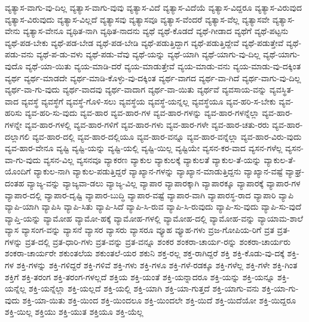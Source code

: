 {ವ್ಯತ್ಯಾಸ-ವಾಗು-ವು-ದಿಲ್ಲ
ವ್ಯತ್ಯಾಸ-ವಾಗು-ವುವು
ವ್ಯತ್ಯಾಸ-ವಿದೆ
ವ್ಯತ್ಯಾಸ-ವಿದೆಯೆ
ವ್ಯತ್ಯಾಸ-ವಿದ್ದರೂ
ವ್ಯತ್ಯಾಸ-ವಿರುವುದ
ವ್ಯತ್ಯಾಸ-ವಿರುವುದು
ವ್ಯತ್ಯಾಸ-ವಿಲ್ಲದೆ
ವ್ಯತ್ಯಾಸವು
ವ್ಯತ್ಯಾಸವೂ
ವ್ಯತ್ಯಾಸ-ವೆಂದರೆ
ವ್ಯತ್ಯಾಸ-ವೆಲ್ಲ
ವ್ಯತ್ಯಾಸವೇ
ವ್ಯತ್ಯಾಸ-ವೇನು
ವ್ಯತ್ಯಾಸ-ವೇನೂ
ವ್ಯಥಿತ-ನಾಗಿ
ವ್ಯಥಿತ-ನಾದನು
ವ್ಯಥೆ
ವ್ಯಥೆ-ಕೊಡದೆ
ವ್ಯಥೆ-ಗೀಡಾದ
ವ್ಯಥೆಗೆ
ವ್ಯಥೆ-ಪಟ್ಟನು
ವ್ಯಥೆ-ಪಡ-ಬೇಕು
ವ್ಯಥೆ-ಪಡ-ಬೇಡ
ವ್ಯಥೆ-ಪಡ-ಬೇಡಿ
ವ್ಯಥೆ-ಪಡುತ್ತಿದ್ದಾಗ
ವ್ಯಥೆ-ಪಡುತ್ತಿದ್ದೇವೆ
ವ್ಯಥೆ-ಪಡುತ್ತೇವೆ
ವ್ಯಥೆ-ಪಡು-ವನು
ವ್ಯಥೆ-ಪ-ಡು-ವಳು
ವ್ಯಥೆ-ಪಡು-ವೆವು
ವ್ಯಥೆ-ಯನ್ನು
ವ್ಯಥೆ-ಯಾಗಿ
ವ್ಯಥೆ-ಯಾಗು-ವು-ದಿಲ್ಲ
ವ್ಯಥೆ-ಯಾಗು-ವುದೊ
ವ್ಯಥೆ-ಯಾ-ಯಿತು
ವ್ಯಯ-ಮಾಡಿ-ದರೆ
ವ್ಯಯ-ಮಾಡುತ್ತೇವೆ
ವ್ಯಯ-ಮಾಡು-ವನು
ವ್ಯಯ-ಮಾಡು-ವು-ದಕ್ಕಿಂತ
ವ್ಯರ್ಥ
ವ್ಯರ್ಥ-ಮಾಡದೇ
ವ್ಯರ್ಥ-ಮಾಡಿ-ಕೊಳ್ಳು-ವು-ದಕ್ಕಿಂತ
ವ್ಯರ್ಥ-ವಾಗದ
ವ್ಯರ್ಥ-ವಾ-ಗಿದೆ
ವ್ಯರ್ಥ-ವಾಗು-ವು-ದಿಲ್ಲ
ವ್ಯರ್ಥ-ವಾ-ಗು-ವುದು
ವ್ಯರ್ಥ-ವಾದವು
ವ್ಯರ್ಥ-ವಾದಾಗ
ವ್ಯರ್ಥ-ವಾ-ಯಿತು
ವ್ಯರ್ಥವೆ
ವ್ಯವಸಾಯ-ವನ್ನು
ವ್ಯವಸ್ಥಿತ-ವಾದ
ವ್ಯವಸ್ಥೆ
ವ್ಯವಸ್ಥೆಗೆ
ವ್ಯವಸ್ಥೆ-ಗೊಳಿ-ಸಲು
ವ್ಯವಸ್ಥೆಯ
ವ್ಯವಸ್ಥೆ-ಯನ್ನಲ್ಲ
ವ್ಯವಸ್ಥೆಯೂ
ವ್ಯವ-ಹರಿ-ಸ-ಬೇಕು
ವ್ಯವ-ಹರಿಸು
ವ್ಯವ-ಹರಿ-ಸು-ವುದು
ವ್ಯವ-ಹಾರ
ವ್ಯವ-ಹಾರ-ಗಳ
ವ್ಯವ-ಹಾರ-ಗಳನ್ನು
ವ್ಯವ-ಹಾರ-ಗಳನ್ನೆಲ್ಲಾ
ವ್ಯವ-ಹಾರ-ಗಳನ್ನೇ
ವ್ಯವ-ಹಾರ-ಗಳಲ್ಲಿ
ವ್ಯವ-ಹಾರ-ಗಳಿಗೆ
ವ್ಯವ-ಹಾರ-ಗಳು
ವ್ಯವ-ಹಾರ-ಗಳೇ
ವ್ಯವ-ಹಾರ-ಚತು-ರರು
ವ್ಯವ-ಹಾರ-ದಲ್ಲಾಗಲಿ
ವ್ಯವ-ಹಾರ-ದಲ್ಲಿ
ವ್ಯವ-ಹಾರ-ದಲ್ಲಿಯೂ
ವ್ಯವ-ಹಾರ-ವನ್ನೂ
ವ್ಯವ-ಹಾರ-ವನ್ನೆಲ್ಲಾ
ವ್ಯವ-ಹಾರ-ವಿರು-ವುದು
ವ್ಯವ-ಹಾರ-ವೇನೂ
ವ್ಯಷ್ಟಿ
ವ್ಯಷ್ಟಿ-ಯನ್ನು
ವ್ಯಷ್ಟಿ-ಯಲ್ಲಿ
ವ್ಯಷ್ಟಿ-ಯಿಲ್ಲ
ವ್ಯಷ್ಟಿಯೇ
ವ್ಯಸನ-ಕರ-ವಾದ
ವ್ಯಸನ-ಗಳೆಲ್ಲ
ವ್ಯಸನ-ವಾ-ಗು-ವುದು
ವ್ಯಸನ-ವಿಲ್ಲ
ವ್ಯಸನವೂ
ವ್ಯಾಕರಣ
ವ್ಯಾಕುಲ
ವ್ಯಾಕುಲಕ್ಕೆ
ವ್ಯಾಕುಲತೆ
ವ್ಯಾಕುಲ-ತೆ-ಯನ್ನು
ವ್ಯಾಕುಲ-ತೆ-ಯೊಂದಿಗೆ
ವ್ಯಾಕುಲ-ನಾಗಿ
ವ್ಯಾಕುಲ-ಪಡುತ್ತಿದ್ದರೆ
ವ್ಯಾಖ್ಯಾನ-ಗಳನ್ನು
ವ್ಯಾಖ್ಯಾನ-ಮಾಡುತ್ತಿದ್ದನು
ವ್ಯಾಖ್ಯಾನ-ವಷ್ಟೆ
ವ್ಯಾಘ್ರ-ದಂತಹ
ವ್ಯಾಜ್ಯ-ವನ್ನು
ವ್ಯಾಜ್ಯವಾ-ಡಲು
ವ್ಯಾಜ್ಯ-ವಿಲ್ಲ
ವ್ಯಾಪಾರ
ವ್ಯಾಪಾರಕ್ಕಾಗಿ
ವ್ಯಾಪಾರಕ್ಕೂ
ವ್ಯಾಪಾರಕ್ಕೆ
ವ್ಯಾಪಾರ-ಗಳ
ವ್ಯಾಪಾರ-ದಲ್ಲಿ
ವ್ಯಾಪಾರ-ದೃಷ್ಟಿ
ವ್ಯಾಪಾರ-ಬುದ್ಧಿ
ವ್ಯಾಪಾರ-ವಷ್ಟೆ
ವ್ಯಾಪಾರ-ವಾಗಿ
ವ್ಯಾಪಾರಸ್ಥ-ರಾದ
ವ್ಯಾಪಾರಿ
ವ್ಯಾಪಿ
ವ್ಯಾಪಿ-ಯಾಗಿ
ವ್ಯಾಪಿಸಿ
ವ್ಯಾಪಿ-ಸಿತು
ವ್ಯಾಪಿ-ಸಿದೆ
ವ್ಯಾಪಿ-ಸಿ-ರುವ
ವ್ಯಾಪಿ-ಸಿ-ರುವುದು
ವ್ಯಾಪಿ-ಸು-ವುದು
ವ್ಯಾಪಿ-ಸು-ವುದೆ
ವ್ಯಾಪ್ತಿ-ಯನ್ನು
ವ್ಯಾಮೋಹ
ವ್ಯಾಮೋ-ಹಕ್ಕೆ
ವ್ಯಾಮೋಹ-ಗಳಲ್ಲಿ
ವ್ಯಾಮೋಹ-ದಲ್ಲಿ
ವ್ಯಾಮೋಹ-ವನ್ನು
ವ್ಯಾಯಾಮ-ಶಾಲೆ
ವ್ಯಾಸ
ವ್ಯಾಸಂಗ-ವನ್ನು
ವ್ಯಾಸನೆ
ವ್ಯಾಸರ
ವ್ಯಾಸರು
ವ್ಯಾಸರೂ
ವ್ಯೂಹ
ವ್ಯೂಹ-ಗಳು
ವ್ರಜ-ಗೋಪಿಯ-ರಿಗೆ
ವ್ರತ
ವ್ರತ-ಗಳನ್ನು
ವ್ರತ-ದಲ್ಲಿ
ವ್ರತ-ಧಾರಿ-ಗಳು
ವ್ರತ-ವನ್ನು
ವ್ರತ-ವನ್ನೂ
ಶಂಕರ
ಶಂಕರಾ-ಚಾರ್ಯ-ರನ್ನು
ಶಂಕರಾ-ಚಾರ್ಯರು
ಶಂಕರಾ-ಚಾರ್ಯರೇ
ಶಕುಂತಲೆಯ
ಶಕುಂತಲೆ-ಯರ
ಶಕುನಿ
ಶಕ್ತ-ರಲ್ಲ
ಶಕ್ತ-ರಾಗಿದ್ದರೆ
ಶಕ್ತಿ
ಶಕ್ತಿ-ಕೊಡು-ವು-ದಕ್ಕೆ
ಶಕ್ತಿ-ಗಳ
ಶಕ್ತಿ-ಗಳನ್ನು
ಶಕ್ತಿ-ಗಳಿದ್ದರೆ
ಶಕ್ತಿ-ಗಳಿವೆ
ಶಕ್ತಿ-ಗಳು
ಶಕ್ತಿ-ಗಳೂ
ಶಕ್ತಿ-ಗಳೆ-ರಡಕ್ಕೂ
ಶಕ್ತಿ-ಗಳೆಲ್ಲ
ಶಕ್ತಿ-ಗಳೇ
ಶಕ್ತಿ-ಗಿಂತ
ಶಕ್ತಿಗೆ
ಶಕ್ತಿ-ತರಂಗ
ಶಕ್ತಿ-ತರಂಗ-ಗಳಲ್ಲದೆ
ಶಕ್ತಿಯ
ಶಕ್ತಿ-ಯಂತೆ
ಶಕ್ತಿ-ಯನ್ನಾದರೂ
ಶಕ್ತಿ-ಯನ್ನು
ಶಕ್ತಿ-ಯನ್ನೂ
ಶಕ್ತಿ-ಯನ್ನೆಲ್ಲ
ಶಕ್ತಿ-ಯನ್ನೆಲ್ಲಾ
ಶಕ್ತಿ-ಯಲ್ಲದೆ
ಶಕ್ತಿ-ಯಲ್ಲಿ
ಶಕ್ತಿ-ಯಾಗಿ
ಶಕ್ತಿ-ಯಾ-ಗುತ್ತದೆ
ಶಕ್ತಿ-ಯಾಗು-ವನು
ಶಕ್ತಿ-ಯಾ-ಗು-ವುದು
ಶಕ್ತಿ-ಯಾ-ಯಿತು
ಶಕ್ತಿ-ಯಿಂದ
ಶಕ್ತಿ-ಯಿಂದಲೂ
ಶಕ್ತಿ-ಯಿಂದಲೇ
ಶಕ್ತಿ-ಯಿದೆ
ಶಕ್ತಿ-ಯಿದೆಯೋ
ಶಕ್ತಿ-ಯಿದ್ದರೂ
ಶಕ್ತಿ-ಯಿಲ್ಲ
ಶಕ್ತಿಯು
ಶಕ್ತಿ-ಯುತ
ಶಕ್ತಿಯೂ
ಶಕ್ತಿ-ಯೆಲ್ಲ
}
